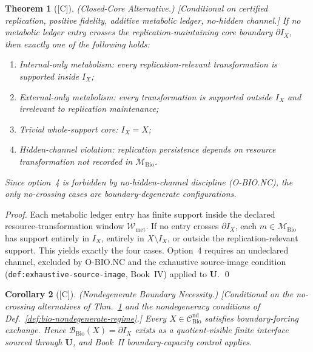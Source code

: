 \documentclass[12pt,oneside]{amsbook}
\theoremstyle{plain}
\newtheorem{theorem}{Theorem}[section]
\newtheorem{corollary}[theorem]{Corollary}
\theoremstyle{definition}
\theoremstyle{remark}
\newcommand{\status}[1]{\textup{[#1]}}
\begin{document}
\begin{theorem}[\status{C}]\label{thm:bio-BND-closed-core-alt}
\textup{(Closed-Core Alternative.)}
\textup{[Conditional on certified replication, positive fidelity,
additive metabolic ledger, no-hidden channel.]}
If no metabolic ledger entry crosses the replication-maintaining core
boundary $\partial I_X$, then exactly one of the following holds:
\begin{enumerate}[label=\textup{(\arabic*)}]
 \item \emph{Internal-only metabolism}: every
 replication-relevant transformation is supported inside $I_X$;
 \item \emph{External-only metabolism}: every transformation is
 supported outside $I_X$ and irrelevant to replication
 maintenance;
 \item \emph{Trivial whole-support core}: $I_X = X$;
 \item \emph{Hidden-channel violation}: replication persistence
 depends on resource transformation not recorded in
 $\mathcal{M}_{\mathrm{Bio}}$.
\end{enumerate}
Since option~4 is forbidden by no-hidden-channel discipline (O-BIO.NC),
the only no-crossing cases are boundary-degenerate configurations.
\end{theorem}

\begin{proof}
Each metabolic ledger entry has finite support inside the declared
resource-transformation window $\mathcal{W}_{\mathrm{met}}$. If no
entry crosses $\partial I_X$, each $m \in \mathcal{M}_{\mathrm{Bio}}$
has support entirely in $I_X$, entirely in $X \setminus I_X$, or
outside the replication-relevant support. This yields exactly the
four cases. Option~4 requires an undeclared channel, excluded by
O-BIO.NC and the exhaustive source-image condition
(\texttt{def:exhaustive-source-image}, Book~IV) applied to $\mathbf{U}$.
\qed
\end{proof}

\begin{corollary}[\status{C}]\label{cor:bio-BND-nondegenerate-necessity}
\textup{(Nondegenerate Boundary Necessity.)}
\textup{[Conditional on the no-crossing alternatives of
Thm.~\ref{thm:bio-BND-closed-core-alt} and the nondegeneracy
conditions of Def.~\ref{def:bio-nondegenerate-regime}.]}
Every $X \in \mathcal{C}_{\mathrm{Bio}}^{\mathrm{nd}}$ satisfies
boundary-forcing exchange. Hence
$\mathcal{B}_{\mathrm{Bio}}(X) = \partial I_X$ exists as a
quotient-visible finite interface sourced through $\mathbf{U}$,
and Book~II boundary-capacity control applies.
\end{corollary}
\end{document}
